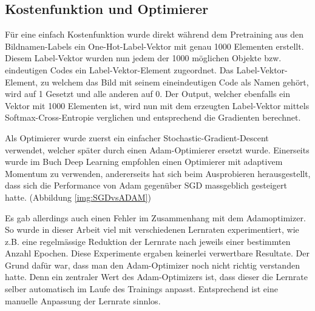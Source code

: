 \subsection{Kostenfunktion und Optimierer}
Für eine einfach Kostenfunktion wurde direkt während dem Pretraining aus den Bildnamen-Labels ein One-Hot-Label-Vektor mit genau 1000 Elementen erstellt.
Diesem Label-Vektor wurden nun jedem der 1000 möglichen Objekte bzw. eindeutigen Codes ein Label-Vektor-Element zugeordnet. 
Das Label-Vektor-Element, zu welchem das Bild mit seinem eineindeutigen Code als Namen gehört, wird auf 1 Gesetzt und alle anderen auf 0.
Der Output, welcher ebenfalls ein Vektor mit 1000 Elementen ist, wird nun mit dem erzeugten Label-Vektor mittels Softmax-Cross-Entropie verglichen und entsprechend die Gradienten berechnet. 

Als Optimierer wurde zuerst ein einfacher Stochastic-Gradient-Descent verwendet, welcher später durch einen Adam-Optimierer ersetzt wurde. 
Einerseits wurde im Buch Deep Learning \cite{deeplearning} empfohlen einen Optimierer mit adaptivem Momentum zu verwenden, andererseits hat sich beim Ausprobieren herausgestellt, dass sich die Performance von Adam gegenüber SGD massgeblich gesteigert hatte. (Abbildung \ref{img:SGDvsADAM})

Es gab allerdings auch einen Fehler im Zusammenhang mit dem Adamoptimizer.
So wurde in dieser Arbeit viel mit verschiedenen Lernraten experimentiert, wie z.B. eine regelmässige Reduktion der Lernrate nach jeweils einer bestimmten Anzahl Epochen.
Diese Experimente ergaben keinerlei verwertbare Resultate.
Der Grund dafür war, dass man den Adam-Optimizer noch nicht richtig verstanden hatte.
Denn ein zentraler Wert des Adam-Optimizers ist, dass dieser die Lernrate selber automatisch im Laufe des Trainings \grqq{}anpasst\grqq{}.
Entsprechend ist eine manuelle Anpassung der Lernrate sinnlos.

